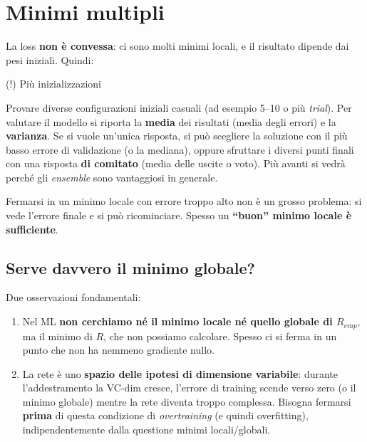 \section{Minimi multipli}\label{minimi-multipli}

La loss \textbf{non è convessa}: ci sono molti minimi locali, e il
risultato dipende dai pesi iniziali. Quindi:

\begin{boxtip}{(!) Più inizializzazioni}

Provare diverse configurazioni iniziali casuali (ad esempio 5--10 o più
\emph{trial}). Per valutare il modello si riporta la \textbf{media} dei
risultati (media degli errori) e la \textbf{varianza}. Se si vuole
un'unica risposta, si può scegliere la soluzione con il più basso errore
di validazione (o la mediana), oppure sfruttare i diversi punti finali
con una risposta \textbf{di comitato} (media delle uscite o voto). Più
avanti si vedrà perché gli \emph{ensemble} sono vantaggiosi in generale.

\end{boxtip}

Fermarsi in un minimo locale con errore troppo alto non è un grosso
problema: si vede l'errore finale e si può ricominciare. Spesso un
\textbf{``buon'' minimo locale è sufficiente}.

\subsection{Serve davvero il minimo
globale?}\label{serve-davvero-il-minimo-globale}

Due osservazioni fondamentali:

\begin{enumerate}
\def\labelenumi{\arabic{enumi}.}
\tightlist
\item
  Nel ML \textbf{non cerchiamo né il minimo locale né quello globale di
  \(R_{emp}\)}, ma il minimo di \(R\), che non possiamo calcolare.
  Spesso ci si ferma in un punto che non ha nemmeno gradiente nullo.
\item
  La rete è uno \textbf{spazio delle ipotesi di dimensione variabile}:
  durante l'addestramento la VC-dim cresce, l'errore di training scende
  verso zero (o il minimo globale) mentre la rete diventa troppo
  complessa. Bisogna fermarsi \textbf{prima} di questa condizione di
  \emph{overtraining} (e quindi overfitting), indipendentemente dalla
  questione minimi locali/globali.
\end{enumerate}

